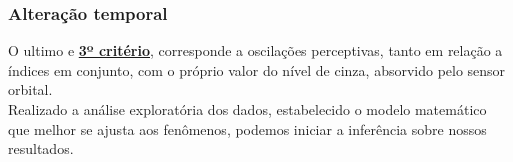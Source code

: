 \subsubsection{ Alteração temporal}

 \hspace*{1.25 cm} O ultimo e \textbf{\underline{3º critério}}, corresponde a oscilações perceptivas, tanto em relação a índices em conjunto, com o próprio  valor  do nível de cinza, absorvido pelo sensor orbital.\\
 \hspace*{1.25 cm} Realizado a análise exploratória dos dados, estabelecido o modelo matemático que melhor se ajusta aos  fenômenos, podemos iniciar a inferência sobre nossos resultados. 

